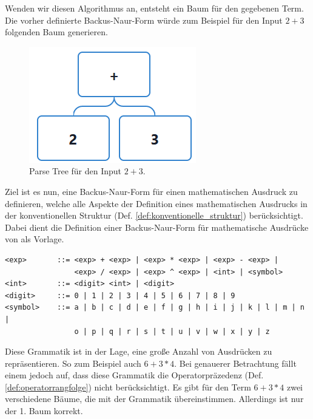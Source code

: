 \documentclass[11pt]{article}
\newcommand{\lab}[1]{(Def. \ref{#1})}
\begin{document}
Wenden wir diesen Algorithmus an, 
entsteht ein Baum für den gegebenen Term.
Die vorher definierte Backus-Naur-Form würde 
zum Beispiel für den Input $2+3$ folgenden Baum generieren.

\begin{figure}[h]
  \centering
  \includegraphics[scale=0.5]{trees/beispiel_bnf_1.png}
  \caption{Parse Tree für den Input $2+3$.}
\end{figure}

Ziel ist es nun, eine Backus-Naur-Form für einen mathematischen Ausdruck 
zu definieren, welche alle Aspekte der Definition 
eines mathematischen Ausdrucks in der konventionellen Struktur 
\lab{def:konventionelle_struktur} berücksichtigt. Dabei dient die
Definition einer Backus-Naur-Form für mathematische Ausdrücke von \citeauthor{BNF_PT}
\cite{BNF_PT} als Vorlage.

\begin{verbatim}
<exp>       ::= <exp> + <exp> | <exp> * <exp> | <exp> - <exp> | 
                <exp> / <exp> | <exp> ^ <exp> | <int> | <symbol>
<int>       ::= <digit> <int> | <digit>
<digit>     ::= 0 | 1 | 2 | 3 | 4 | 5 | 6 | 7 | 8 | 9 
<symbol>    ::= a | b | c | d | e | f | g | h | i | j | k | l | m | n | 
                o | p | q | r | s | t | u | v | w | x | y | z
\end{verbatim}

Diese Grammatik ist in der Lage, eine große Anzahl von Ausdrücken zu repräsentieren. 
So zum Beispiel auch $6+3*4$. Bei genauerer Betrachtung fällt einem jedoch auf, 
dass diese Grammatik die Operatorpräzedenz \lab{def:operatorrangfolge} 
nicht berücksichtigt. 
Es gibt für den Term $6+3*4$ zwei verschiedene Bäume, 
die mit der Grammatik übereinstimmen. 
Allerdings ist nur der 1. Baum korrekt. 
\end{document}
